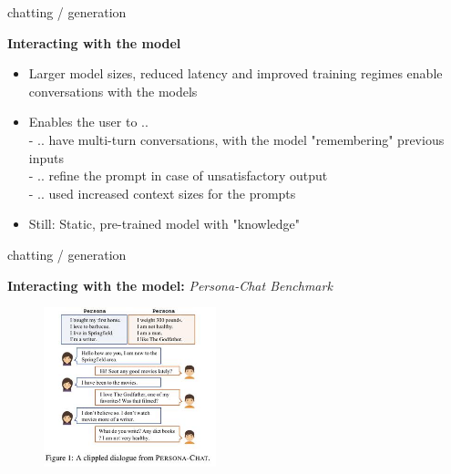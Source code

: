 \begin{vbframe}{chatting / generation}

\vfill
	
\textbf{Interacting with the model}

\begin{itemize}
	\item Larger model sizes, reduced latency and improved training regimes enable conversations with the models
	\item Enables the user to .. \\
	- .. have multi-turn conversations, with the model "remembering" previous inputs\\
	- .. refine the prompt in case of unsatisfactory output\\
	- .. used increased context sizes for the prompts
	\item Still: Static, pre-trained model with "knowledge" 
\end{itemize}

\vfill

\end{vbframe}


\begin{vbframe}{chatting / generation}

\vfill
	
\textbf{Interacting with the model:} \textit{Persona-Chat Benchmark}

\begin{figure}
	\centering
		\includegraphics[width = 5cm]{figure/persona-chat.jpg}\\ 
\end{figure}

\vfill

\end{vbframe}

